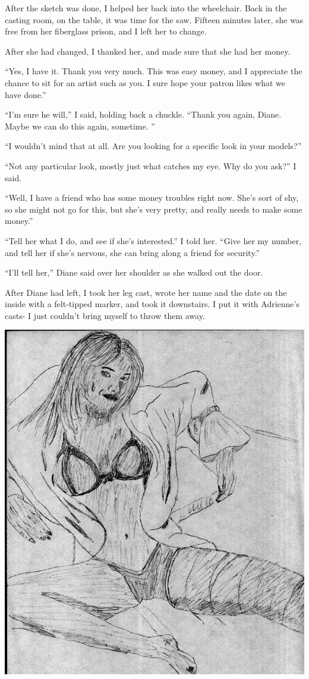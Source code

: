After the sketch was done, I helped her back into the wheelchair. Back in the casting room, on
the table, it was time for the saw. Fifteen minutes later, she was free from her fiberglass
prison, and I left her to change.

After she had changed, I thanked her, and made sure that she had her money.

``Yes, I have it. Thank you very much. This was easy money, and I appreciate the chance to sit
for an artist such as you. I sure hope your patron likes what we have done.''

``I'm sure he will,'' I said, holding back a chuckle. ``Thank you again, Diane. Maybe we can do
this again, sometime. ''

``I wouldn't mind that at all. Are you looking for a specific look in your models?''

``Not any particular look, mostly just what catches my eye. Why do you ask?'' I said.

``Well, I have a friend who has some money troubles right now. She's sort of shy, so she might
not go for this, but she's very pretty, and really needs to make some money.''

``Tell her what I do, and see if she's interested.'' I told her. ``Give her my number, and tell
her if she's nervous, she can bring along a friend for security.''

``I'll tell her,'' Diane said over her shoulder as she walked out the door.

After Diane had left, I took her leg cast, wrote her name and the date on the inside with a
felt-tipped marker, and took it downstairs. I put it with Adrienne's casts- I just couldn't
bring myself to throw them away.

\newpage
\begin{center}
\includegraphics[width=\textwidth]{images/kicks03.jpg}
\end{center}
